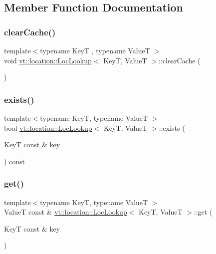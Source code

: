 \subsection{Member Function Documentation}
\mbox{\label{structvt_1_1location_1_1_loc_lookup_aae2c3e418b59b36c0a53da17fe7fb3b8}} 
\subsubsection{\texorpdfstring{clear\+Cache()}{clearCache()}}
{\footnotesize\ttfamily template$<$typename KeyT , typename ValueT $>$ \\
void \hyperlink{structvt_1_1location_1_1_loc_lookup}{vt\+::location\+::\+Loc\+Lookup}$<$ KeyT, ValueT $>$\+::clear\+Cache (\begin{DoxyParamCaption}{ }\end{DoxyParamCaption})}

\mbox{\label{structvt_1_1location_1_1_loc_lookup_ad1c4809e9687c975335fee019cc3e39b}} 
\subsubsection{\texorpdfstring{exists()}{exists()}}
{\footnotesize\ttfamily template$<$typename KeyT, typename ValueT $>$ \\
bool \hyperlink{structvt_1_1location_1_1_loc_lookup}{vt\+::location\+::\+Loc\+Lookup}$<$ KeyT, ValueT $>$\+::exists (\begin{DoxyParamCaption}\item[{KeyT const \&}]{key }\end{DoxyParamCaption}) const}

\mbox{\label{structvt_1_1location_1_1_loc_lookup_a3be47c30312499b386c2d459b4b81c9f}} 
\subsubsection{\texorpdfstring{get()}{get()}}
{\footnotesize\ttfamily template$<$typename KeyT, typename ValueT $>$ \\
ValueT const  \& \hyperlink{structvt_1_1location_1_1_loc_lookup}{vt\+::location\+::\+Loc\+Lookup}$<$ KeyT, ValueT $>$\+::get (\begin{DoxyParamCaption}\item[{KeyT const \&}]{key }\end{DoxyParamCaption})}

